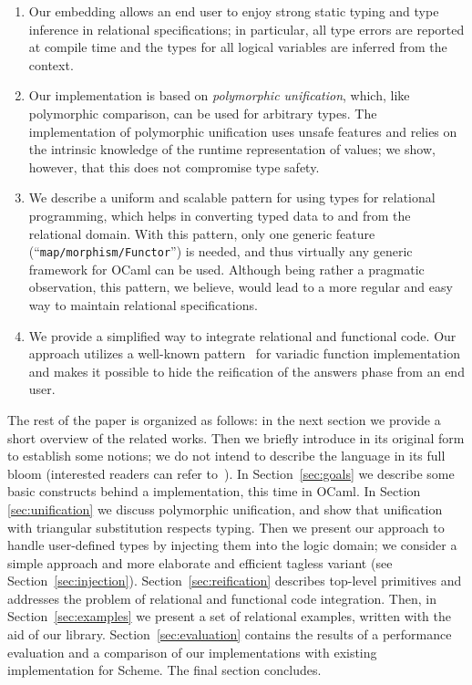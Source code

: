 \begin{enumerate}
\item Our embedding allows an end user to enjoy strong static typing and type inference in relational
specifications; in particular, all type errors are reported at compile time and the types for
all logical variables are inferred from the context.

\item Our implementation is based on \emph{polymorphic unification}, which, like polymorphic comparison,
can be used for arbitrary types. The implementation of polymorphic unification uses unsafe features and
relies on the intrinsic knowledge of the runtime representation of values; we show, however, that this does not
compromise type safety.

\item We describe a uniform and scalable pattern for using types for relational programming, which
helps in converting typed data to and from the relational domain. With this pattern, only one
generic feature (``\lstinline{map/morphism/Functor}'') is needed, and thus virtually any generic 
framework for OCaml can be used. Although being rather a pragmatic observation, this pattern, we
believe, would lead to a more regular and easy way to maintain relational specifications.

\item We provide a simplified way to integrate relational and functional code. Our approach utilizes
a well-known pattern~\cite{Unparsing, DoWeNeed} for variadic function implementation and makes it
possible to hide the reification of the answers phase from an end user.
\end{enumerate}

The rest of the paper is organized as follows: in the next section we provide a short overview of the related
works. Then we briefly introduce \miniKanren in
its original form to establish some notions; we do not intend to describe the language in its full bloom (interested readers can
refer to~\cite{TRS}). In Section~\ref{sec:goals} we describe some basic constructs behind a \miniKanren implementation, this time 
in OCaml. In Section \ref{sec:unification} we discuss polymorphic unification, and show that unification with 
triangular substitution respects typing. Then we present our approach to handle user-defined types by injecting them 
into the logic domain; we consider a simple approach and more elaborate and efficient tagless variant (see Section~\ref{sec:injection}). 
Section~\ref{sec:reification} describes top-level primitives and addresses the problem of relational and functional code integration. 
Then, in Section~\ref{sec:examples} we present a set of relational examples, written with the aid of our 
library. Section~\ref{sec:evaluation} contains the results of a performance evaluation and a comparison of our implementations 
with existing implementation for Scheme. The final section concludes.

